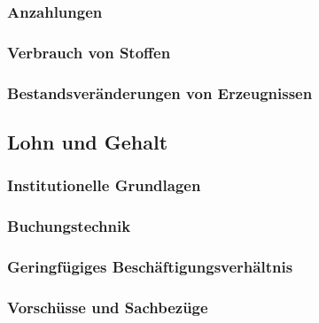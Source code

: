 \documentclass[paper=a4, fontsize=11pt]{scrartcl}
\numberwithin{equation}{section}
\numberwithin{figure}{section}
\numberwithin{table}{section}
\begin{document}

\subsubsection{Anzahlungen}


\subsubsection{Verbrauch von Stoffen}


\subsubsection{Bestandsveränderungen von Erzeugnissen}


\subsection{Lohn und Gehalt}


\subsubsection{Institutionelle Grundlagen}


\subsubsection{Buchungstechnik}


\subsubsection{Geringfügiges Beschäftigungsverhältnis}


\subsubsection{Vorschüsse und Sachbezüge}
\end{document}
